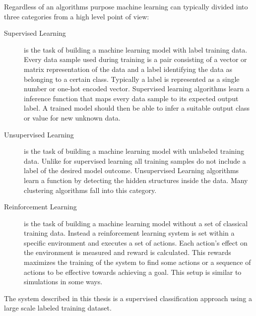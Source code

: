 Regardless of an algorithms purpose machine learning can typically divided into three categories from a high level point of view:

	\begin{description}
		\item[Supervised Learning] is the task of building a machine learning model with label training data. Every data sample used during training is a pair consisting of a vector or matrix representation of the data and a label identifying the data as belonging to a certain class. Typically a label is represented as a single number or one-hot encoded vector. Supervised learning algorithms learn a inference function that maps every data sample to its expected output label. A trained model should then be able to infer a suitable output class or value for new unknown data. 
				
		\item[Unsupervised Learning] is the task of building a machine learning model with unlabeled training data. Unlike for supervised learning all training samples do not include a label of the desired model outcome. Unsupervised Learning algorithms learn a function by  detecting the hidden structures inside the data. Many clustering algorithms fall into this category.
		
		\item[Reinforcement Learning] is the task of building a machine learning model without a set of classical training data. Instead a reinforcement learning system is set within a specific environment and executes a set of actions. Each action's effect on the environment is measured and reward is calculated. This rewards maximizes the training of the system to find some actions or a sequence of actions to be effective towards achieving a goal. This setup is similar to simulations in some ways. 
	\end{description}

The system described in this thesis is a supervised classification approach using a large scale labeled training dataset.

